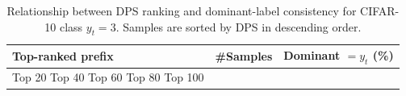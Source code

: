 \begin{table}[t]
\centering
\begin{tabular}{lrr}
\toprule
Top-ranked prefix & \#Samples & Dominant $= y_t$ (\%) \\
\midrule
Top 20%
Top 40%
Top 60%
Top 80%
Top 100%
\bottomrule
\caption{Relationship between DPS ranking and dominant-label consistency for CIFAR-10 class $y_t=3$. Samples are sorted by DPS in descending order.}
\label{tab:class_3_prefix}
\end{tabular}
\end{table}
